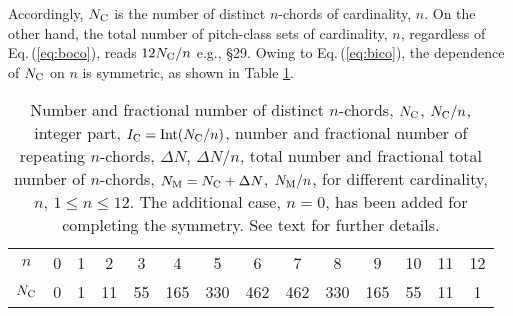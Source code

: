 \documentclass[12pt,a4paper]{article}
\begin{document}
Accordingly, $N_{\rm C}$ is the number of distinct $n$-chords of
cardinality, $n$.   On the other hand, the total number of pitch-class sets of
cardinality, $n$, regardless of Eq.\,(\ref{eq:boco}), reads $12N_{\rm C}/n$
e.g., \cite{Hoo07} \S29.
Owing to Eq.\,(\ref{eq:bico}), the dependence of
$N_{\rm C}$ on $n$ is symmetric, as shown in Table \ref{t:scale}.
%
\begin{table}
\caption{Number and fractional number of distinct $n$-chords,
$N_{\rm C}$, $N_{\rm C}/n$, integer part,
$I_{\rm C}=\Int(N_{\rm C}/n)$, number and fractional number of
repeating $n$-chords, $\Delta N$, $\Delta N/n$, total
number and fractional total number of $n$-chords,
$N_{\rm M}=N_{\rm C}+\Delta N$, $N_{\rm M}/n$, for different
cardinality, $n$, $1\le n\le12$.   The additional case, $n=0$, has been added
for completing the symmetry.   See text for further details.}
\label{t:scale}
\begin{center}
\begin{tabular}{|c|c|c|c|c|c|c|c|c|c|c|c|c|c|} \hline
\hline
$n$                        & \phantom{$$}0          & 1 &  2                  &  3                  &   4                  &   5 &   6 &   7 &   8                  &   9                 & 10                  & 11 & 12                     \\
$N_{\rm C}$                & \phantom{$$}0          & 1 & 11                  & 55                  & 165                  & 330 & 462 & 462 & 330                  & 165                 & 55                  & 11 &  1                     \\

\end{tabular}
\end{center}
\end{table}
\end{document}
